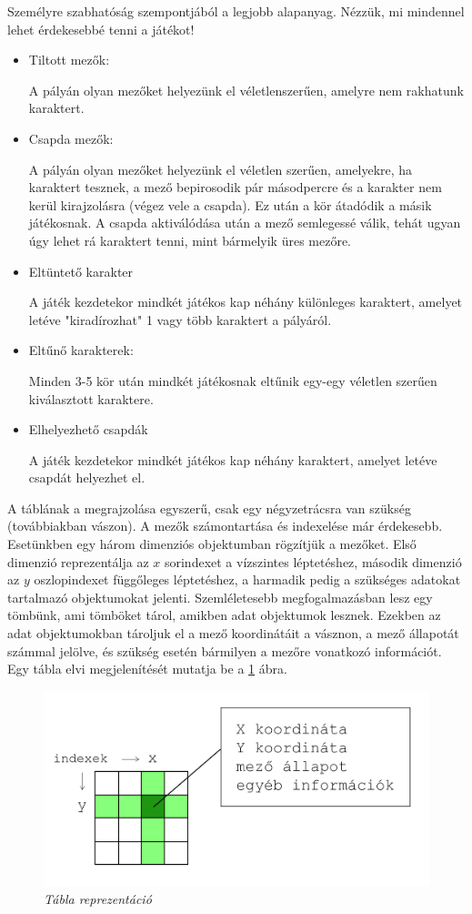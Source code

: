Személyre szabhatóság szempontjából a legjobb alapanyag. Nézzük, mi mindennel lehet érdekesebbé tenni a játékot!
\begin{itemize}
	
	\item Tiltott mezők:
	
	A pályán olyan mezőket helyezünk el véletlenszerűen, amelyre nem rakhatunk karaktert.
	\item Csapda mezők:
	
	A pályán olyan mezőket helyezünk el véletlen szerűen, amelyekre, ha karaktert tesznek, a mező bepirosodik pár másodpercre és a karakter nem kerül kirajzolásra (végez vele a csapda). Ez után a kör átadódik a másik játékosnak. A csapda aktiválódása után a mező semlegessé válik, tehát ugyan úgy lehet rá karaktert tenni, mint bármelyik üres mezőre.
	\item Eltüntető karakter
	
	A játék kezdetekor mindkét játékos kap néhány különleges karaktert, amelyet letéve "kiradírozhat" 1 vagy több karaktert a pályáról.
	\item Eltűnő karakterek:
	
	Minden 3-5 kör után mindkét játékosnak eltűnik egy-egy véletlen szerűen kiválasztott karaktere.	
	\item Elhelyezhető csapdák
	
	A játék kezdetekor mindkét játékos kap néhány karaktert, amelyet letéve csapdát helyezhet el.	
\end{itemize}

\label{board-repr}

A táblának a megrajzolása egyszerű, csak egy négyzetrácsra van szükség (továbbiakban vászon). A mezők számontartása és indexelése már érdekesebb. Esetünkben egy három dimenziós objektumban rögzítjük a mezőket. Első dimenzió reprezentálja az $x$ sorindexet a vízszintes léptetéshez, második dimenzió az $y$ oszlopindexet függőleges léptetéshez, a harmadik pedig a szükséges adatokat tartalmazó objektumokat jelenti. Szemléletesebb megfogalmazásban lesz egy tömbünk, ami tömböket tárol, amikben adat objektumok lesznek. Ezekben az adat objektumokban tároljuk el a mező koordinátáit a vásznon, a mező állapotát számmal jelölve, és szükség esetén bármilyen a mezőre vonatkozó információt. Egy tábla elvi megjelenítését mutatja be a \ref{fig:field-repr} ábra.

\begin{figure}[!h]
	\centering
	\includegraphics[width=0.6\linewidth]{kepek/field-representation.png}
	\caption{\textit{Tábla reprezentáció}}
	\label{fig:field-repr}
\end{figure}


